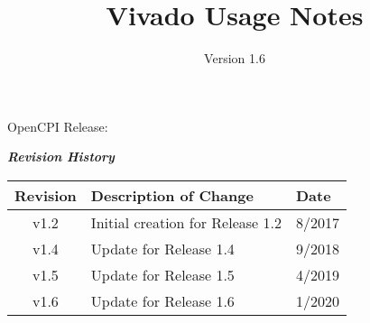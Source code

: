\iffalse
This file is protected by Copyright. Please refer to the COPYRIGHT file
distributed with this source distribution.

This file is part of OpenCPI <http://www.opencpi.org>

OpenCPI is free software: you can redistribute it and/or modify it under the
terms of the GNU Lesser General Public License as published by the Free Software
Foundation, either version 3 of the License, or (at your option) any later
version.

OpenCPI is distributed in the hope that it will be useful, but WITHOUT ANY
WARRANTY; without even the implied warranty of MERCHANTABILITY or FITNESS FOR A
PARTICULAR PURPOSE. See the GNU Lesser General Public License for more details.

You should have received a copy of the GNU Lesser General Public License along
with this program. If not, see <http://www.gnu.org/licenses/>.
\fi
\def\docTitle{Vivado Usage Notes}
\def\docVersion{1.6}
\def\snippetpath{snippets}


\date{Version \docVersion} %
\title{\docTitle}
\lhead{\small{\docTitle}}
\usepackage{enumitem}

\maketitle
\begin{center}
OpenCPI Release: \ocpiversion
\end{center}
\thispagestyle{fancy}
\newpage
\begin{center}
  \textit{\textbf{Revision History}}
  \begin{table}[H]
    \begin{tabularx}{\textwidth}{|c|X|l|}
      \hline
      \rowcolor{blue}
      \textbf{Revision} & \textbf{Description of Change} & \textbf{Date} \\
      \hline
      v1.2 & Initial creation for Release 1.2 & 8/2017 \\
      \hline
      v1.4 & Update for Release 1.4 & 9/2018 \\
      \hline
      v1.5 & Update for Release 1.5 & 4/2019 \\
      \hline
      v1.6 & Update for Release 1.6 & 1/2020 \\
      \hline
    \end{tabularx}
  \end{table}

\end{center}
\newpage

